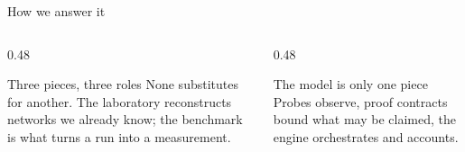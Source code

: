 \documentclass[aspectratio=169,10pt]{beamer}
\begin{document}
\begin{frame}{How we answer it}

  \centering

  \vspace{1.4em}
  \begin{columns}[T,onlytextwidth]
    \begin{column}{0.48\textwidth}
      \begin{block}{Three pieces, three roles}
        \small None substitutes for another. The laboratory reconstructs
        networks we already know; the benchmark is what turns a run into a
        measurement.
      \end{block}
    \end{column}
    \begin{column}{0.48\textwidth}
      \begin{alertblock}{The model is only one piece}
        \small Probes observe, proof contracts bound what may be claimed, the
        engine orchestrates and accounts.
      \end{alertblock}
    \end{column}
  \end{columns}

\end{frame}
\end{document}
